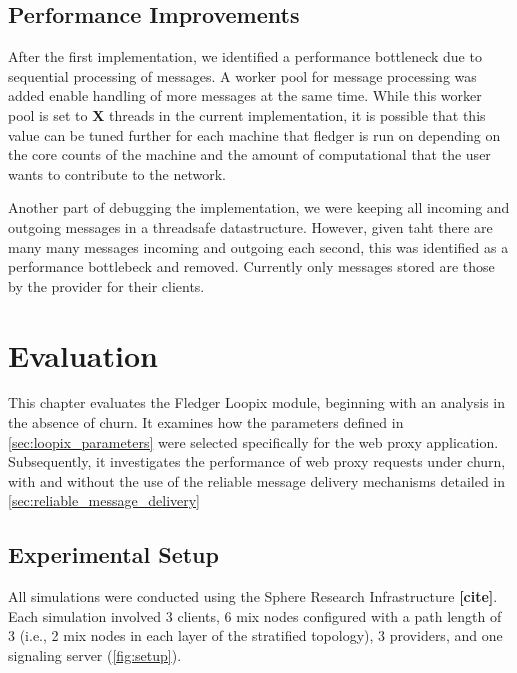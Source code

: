 \documentclass[a4paper,11pt,oneside]{report}
\begin{document}
\section{Performance Improvements}
After the first implementation, we identified a performance bottleneck due to sequential processing of messages. A worker pool for message processing was added enable handling of more messages at the same time. While this worker pool is set to \textbf{X} threads in the current implementation, it is possible that this value can be tuned further for each machine that fledger is run on depending on the core counts of the machine and the amount of computational that the user wants to contribute to the network.

Another part of debugging the implementation, we were keeping all incoming and outgoing messages in a threadsafe datastructure. However, given taht there are many many messages incoming and outgoing each second, this was identified as a performance bottlebeck and removed. Currently only messages stored are those by the provider for their clients. 

\chapter{Evaluation}


This chapter evaluates the Fledger Loopix module, beginning with an analysis in the absence of churn. It examines how the parameters defined in \autoref{sec:loopix_parameters} were selected specifically for the web proxy application. Subsequently, it investigates the performance of web proxy requests under churn, with and without the use of the reliable message delivery mechanisms detailed in \autoref{sec:reliable_message_delivery}

\section{Experimental Setup}
All simulations were conducted using the Sphere Research Infrastructure \textbf{[cite]}. Each simulation involved 3 clients, 6 mix nodes configured with a path length of 3 (i.e., 2 mix nodes in each layer of the stratified topology), 3 providers, and one signaling server (\autoref{fig:setup}).
\end{document}
